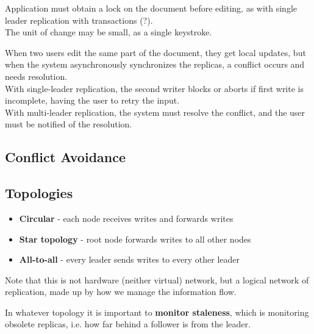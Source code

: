 Application must obtain a lock on the document before editing, as with single leader replication with transactions (?).\\
The unit of change may be small, as a single keystroke.\nl

When two users edit the same part of the document, they get local updates, but when the system asynchronously synchronizes the replicas, a conflict occurs and needs resolution.\\
With single-leader replication, the second writer blocks or aborts if first write is incomplete, having the user to retry the input.\\
With multi-leader replication, the system must resolve the conflict, and the user must be notified of the resolution.

\subsection{Conflict Avoidance}



\subsection{Topologies}
\begin{itemize}
   \item \textbf{Circular} - each node receives writes and forwards writes
   \item \textbf{Star topology} - root node forwards writes to all other nodes 
   \item \textbf{All-to-all} - every leader sends writes to every other leader
\end{itemize}

Note that this is not hardware (neither virtual) network, but a logical network of replication, made up by how we manage the information flow.

In whatever topology it is important to \textbf{monitor staleness}, which is monitoring obsolete replicas, i.e. how far behind a follower is from the leader.